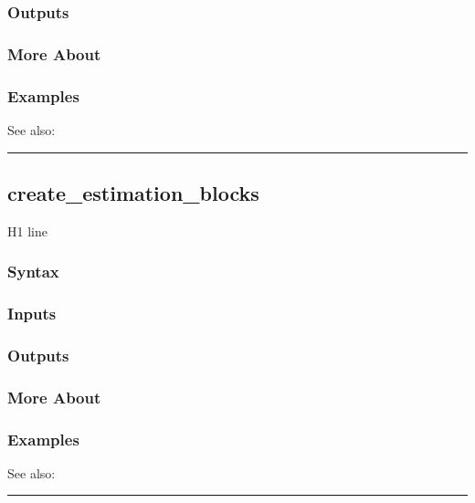 \documentclass[letterpaper,10pt,english]{sphinxmanual}
\begin{document}
\subsubsection{Outputs}
\label{classes/models/@dsge/dsge:id10}

\subsubsection{More About}
\label{classes/models/@dsge/dsge:id11}

\subsubsection{Examples}
\label{classes/models/@dsge/dsge:id12}
See also:


\bigskip\hrule{}\bigskip



\subsection{create\_estimation\_blocks}
\label{classes/models/@dsge/dsge:id13}\label{classes/models/@dsge/dsge:create-estimation-blocks}
H1 line


\subsubsection{Syntax}
\label{classes/models/@dsge/dsge:id14}

\subsubsection{Inputs}
\label{classes/models/@dsge/dsge:id15}

\subsubsection{Outputs}
\label{classes/models/@dsge/dsge:id16}

\subsubsection{More About}
\label{classes/models/@dsge/dsge:id17}

\subsubsection{Examples}
\label{classes/models/@dsge/dsge:id18}
See also:


\bigskip\hrule{}\bigskip
\end{document}
